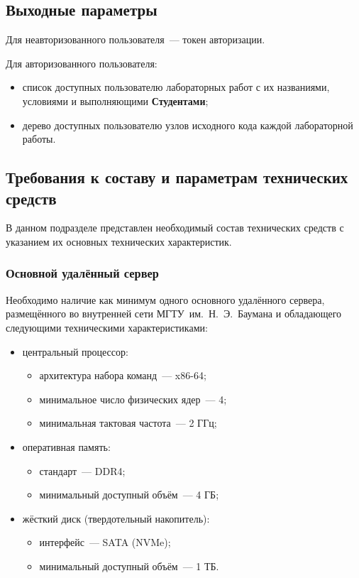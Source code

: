 \documentclass{bmstu}
\begin{document}
  \subsection{Выходные параметры}

  Для неавторизованного пользователя~--- токен авторизации.

  Для авторизованного пользователя:
  \begin{itemize}[label=---]
    \item список доступных пользователю лабораторных работ с их
      названиями, условиями и выполняющими \textbf{Студентами};
    \item дерево доступных пользователю узлов исходного кода каждой
      лабораторной работы.
  \end{itemize}

  \subsection{Требования к составу и параметрам технических средств}

  В данном подразделе представлен необходимый состав технических
  средств с указанием их основных технических характеристик.

  \subsubsection{Основной удалённый сервер}

  Необходимо наличие как минимум одного основного удалённого сервера,
  размещённого во внутренней сети МГТУ~им.~Н.~Э.~Баумана и обладающего
  следующими техническими характеристиками:
  \begin{itemize}[label=---]
    \item центральный процессор:
      \begin{itemize}[label=---]
        \item архитектура набора команд~--- x86-64;
        \item минимальное число физических ядер~--- 4;
        \item минимальная тактовая частота~--- 2 ГГц;
      \end{itemize}
    \item оперативная память:
      \begin{itemize}[label=---]
        \item стандарт~--- DDR4;
        \item минимальный доступный объём~--- 4 ГБ;
      \end{itemize}
    \item жёсткий диск (твердотельный накопитель):
      \begin{itemize}[label=---]
        \item интерфейс~--- SATA (NVMe);
        \item минимальный доступный объём~--- 1 ТБ.
      \end{itemize}
  \end{itemize}
  
\end{document}
